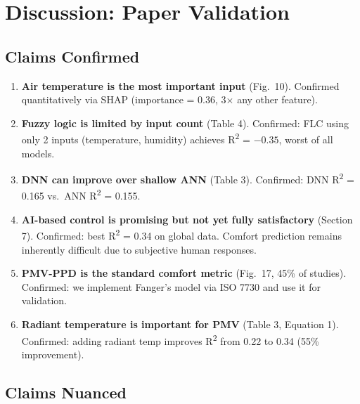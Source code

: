 \documentclass[11pt,a4paper]{article}
\begin{document}
\section{Discussion: Paper Validation}

\subsection{Claims Confirmed}

\begin{enumerate}
    \item \textbf{Air temperature is the most important input} (Fig.\ 10). Confirmed quantitatively via SHAP (importance = 0.36, 3$\times$ any other feature).

    \item \textbf{Fuzzy logic is limited by input count} (Table 4). Confirmed: FLC using only 2 inputs (temperature, humidity) achieves R\textsuperscript{2} = $-0.35$, worst of all models.

    \item \textbf{DNN can improve over shallow ANN} (Table 3). Confirmed: DNN R\textsuperscript{2} = 0.165 vs.\ ANN R\textsuperscript{2} = 0.155.

    \item \textbf{AI-based control is promising but not yet fully satisfactory} (Section 7). Confirmed: best R\textsuperscript{2} = 0.34 on global data. Comfort prediction remains inherently difficult due to subjective human responses.

    \item \textbf{PMV-PPD is the standard comfort metric} (Fig.\ 17, 45\% of studies). Confirmed: we implement Fanger's model via ISO 7730 and use it for validation.

    \item \textbf{Radiant temperature is important for PMV} (Table 3, Equation 1). Confirmed: adding radiant temp improves R\textsuperscript{2} from 0.22 to 0.34 (55\% improvement).
\end{enumerate}

\subsection{Claims Nuanced}
\end{document}
